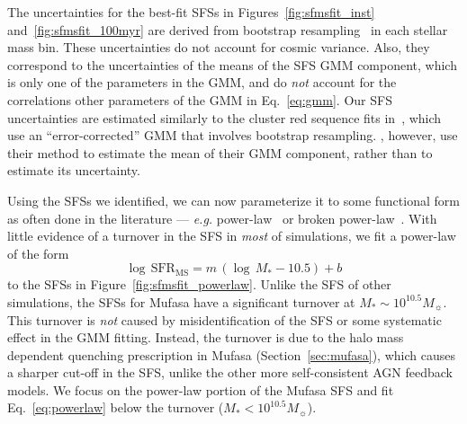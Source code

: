 \documentclass[tighten, preprint]{aastex62}
\begin{document}
The uncertainties for the best-fit SFSs in Figures~\ref{fig:sfmsfit_inst} 
and~\ref{fig:sfmsfit_100myr} are derived from bootstrap resampling~\citep{efron1979} 
in each stellar mass bin. These uncertainties do not account for cosmic 
variance. %
Also, they correspond to the uncertainties of the means of the SFS GMM component, 
which is only one of the parameters in the GMM, and do \emph{not} account for 
the correlations other parameters of the GMM in Eq.~\ref{eq:gmm}. 
Our SFS uncertainties are estimated 
similarly to the cluster red sequence fits in~\cite{hao2009}, which use an 
``error-corrected'' GMM that involves bootstrap resampling. \cite{hao2009}, 
however, use their method to estimate the mean of their GMM component, 
rather than to estimate its uncertainty.

Using the SFSs we identified, we can now parameterize it to 
some functional form as often done in the literature --- \emph{e.g.} 
power-law~\citep{speagle2014} or broken power-law~\citep{lee2015}. With 
little evidence of a turnover in the SFS in {\em most} of simulations, 
we fit a power-law of the form 
\begin{equation} \label{eq:powerlaw}
\log\,\mathrm{SFR}_\mathrm{MS} = m\,(\log\,M_* - 10.5) + b
\end{equation}
to the SFSs in Figure~\ref{fig:sfmsfit_powerlaw}. Unlike the SFS of 
other simulations, the SFSs for {\sc Mufasa} have a significant 
turnover at $M_*{\sim}10^{10.5}M_\sun$. This turnover is \emph{not} 
caused by  misidentification of the SFS or some systematic effect in the 
GMM fitting. Instead, the turnover is due to the halo mass 
dependent quenching prescription in {\sc Mufasa} (Section~\ref{sec:mufasa}), 
which causes a sharper cut-off in the SFS, unlike the other more 
self-consistent AGN feedback models. We focus on the power-law portion 
of the {\sc Mufasa} SFS and fit Eq.~\ref{eq:powerlaw} below the turnover 
($M_*{<}10^{10.5} M_\sun$). 
\end{document}
